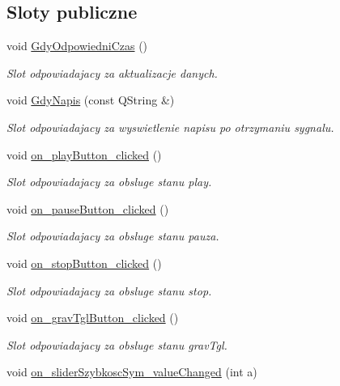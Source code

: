 \subsection*{Sloty publiczne}
\begin{DoxyCompactItemize}
\item 
void \hyperlink{class_okno_glowne_a2a49d3696ef8a42325313842768f2c92}{Gdy\+Odpowiedni\+Czas} ()
\begin{DoxyCompactList}\small\item\em Slot odpowiadajacy za aktualizacje danych. \end{DoxyCompactList}\item 
void \hyperlink{class_okno_glowne_a2a59f13292adfead4ac821780220044a}{Gdy\+Napis} (const Q\+String \&)
\begin{DoxyCompactList}\small\item\em Slot odpowiadajacy za wyswietlenie napisu po otrzymaniu sygnalu. \end{DoxyCompactList}\item 
void \hyperlink{class_okno_glowne_ac837b1f8c8b0288d07987e059966431b}{on\+\_\+play\+Button\+\_\+clicked} ()
\begin{DoxyCompactList}\small\item\em Slot odpowiadajacy za obsluge stanu play. \end{DoxyCompactList}\item 
void \hyperlink{class_okno_glowne_ae8bd560de9aa835ba8b194b8f7da094c}{on\+\_\+pause\+Button\+\_\+clicked} ()
\begin{DoxyCompactList}\small\item\em Slot odpowiadajacy za obsluge stanu pauza. \end{DoxyCompactList}\item 
void \hyperlink{class_okno_glowne_a63255adc6263a1ee6f67c96b91446b73}{on\+\_\+stop\+Button\+\_\+clicked} ()
\begin{DoxyCompactList}\small\item\em Slot odpowiadajacy za obsluge stanu stop. \end{DoxyCompactList}\item 
void \hyperlink{class_okno_glowne_a0c07c0f31c7b79e053ffb6e606ff5293}{on\+\_\+grav\+Tgl\+Button\+\_\+clicked} ()
\begin{DoxyCompactList}\small\item\em Slot odpowiadajacy za obsluge stanu grav\+Tgl. \end{DoxyCompactList}\item 
void \hyperlink{class_okno_glowne_a726ce3fbe89c3fb7364c39e99c0ad658}{on\+\_\+slider\+Szybkosc\+Sym\+\_\+value\+Changed} (int a)

\end{DoxyCompactItemize}

